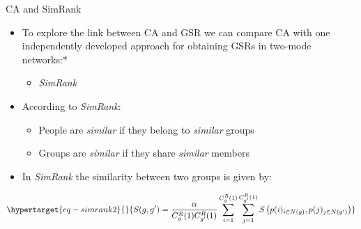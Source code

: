 \documentclass[
  ignorenonframetext,
]{beamer}
\providecommand{\tightlist}{%
  \setlength{\itemsep}{0pt}\setlength{\parskip}{0pt}}\usepackage{longtable,booktabs,array}
\begin{document}
\begin{frame}{CA and SimRank}
\protect\hypertarget{ca-and-simrank-1}{}
\begin{itemize}
\tightlist
\item
  To explore the link between CA and GSR we can compare CA with one
  independently developed approach for obtaining GSRs in two-mode
  networks:*

  \begin{itemize}
  \tightlist
  \item
    \emph{SimRank}
  \end{itemize}
\item
  According to \emph{SimRank}:

  \begin{itemize}
  \tightlist
  \item
    People are \emph{similar} if they belong to \emph{similar} groups
  \item
    Groups are \emph{similar} if they share \emph{similar} members
  \end{itemize}
\item
  In \emph{SimRank} the similarity between two groups is given by:
\end{itemize}

\begin{equation}\protect\hypertarget{eq-simrank2}{}{
S(g, g') = \frac{\alpha}{C_g^R(1)C_{g'}^R(1)}
    \sum_{i = 1}^{C_g^R(1)} \sum_{j = 1}^{C_{g'}^R(1)} 
    S\left(p(i)_{i \in N(g)}, p(j)_{j \in N(g')}\right)
}\label{eq-simrank2}\end{equation}

\end{frame}
\end{document}
